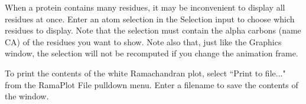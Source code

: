 When a protein contains many residues, it may be inconvenient to display
all residues at once.  Enter an atom selection in the Selection input to
choose which residues to display.  Note that the selection must contain the
alpha carbons (name CA) of the residues you want to show.  Note also that,
just like the Graphics window, the selection will not be recomputed 
if you change the animation frame.  

To print the contents of the white Ramachandran plot, select 
``Print to file..." from the RamaPlot File pulldown menu.  Enter a filename
to save the contents of the window.

